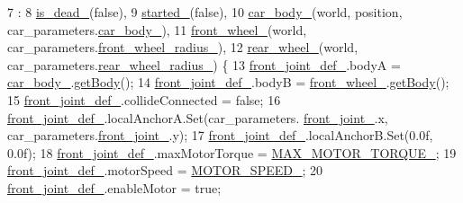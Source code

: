 \begin{DoxyCode}
7                                                                                     :
8                                                                 \hyperlink{classCar_a73e9873dd2c3c0ab7bbd6623ac9085a8}{is\_dead\_}(\textcolor{keyword}{false}),
9                                                                 \hyperlink{classCar_a348ee6b161f174a80ed4c38f9f84d789}{started\_}(\textcolor{keyword}{false}),
10                                                                 \hyperlink{classCar_a6a0d40752a134fb4f0693a28a4e64a0d}{car\_body\_}(world, position, 
      car\_parameters.\hyperlink{classCarParameters_a304345d7fd7771c87421e87785bce810}{car\_body\_}),
11                                                                 \hyperlink{classCar_a9c6abcefc82b364b09e67fad1b200beb}{front\_wheel\_}(world, 
      car\_parameters.\hyperlink{classCarParameters_ab66832af7618ebe04364630c92850096}{front\_wheel\_radius\_}),
12                                                                 \hyperlink{classCar_a2c29a444d66ee10134352516e42c3e0d}{rear\_wheel\_}(world, 
      car\_parameters.\hyperlink{classCarParameters_a6d3c3fc1c4eef292a7f536da2a089bbd}{rear\_wheel\_radius\_}) \{
13     \hyperlink{classCar_a4e2939a9c523e2e264ea2377a4829f7c}{front\_joint\_def\_}.bodyA = \hyperlink{classCar_a6a0d40752a134fb4f0693a28a4e64a0d}{car\_body\_}.\hyperlink{classCarBody_abf98252ba6d666ce771acfdf7c6d66cb}{getBody}();
14     \hyperlink{classCar_a4e2939a9c523e2e264ea2377a4829f7c}{front\_joint\_def\_}.bodyB = \hyperlink{classCar_a9c6abcefc82b364b09e67fad1b200beb}{front\_wheel\_}.\hyperlink{classWheel_af278d5423746dfc46834ec6b225d4e17}{getBody}();
15     \hyperlink{classCar_a4e2939a9c523e2e264ea2377a4829f7c}{front\_joint\_def\_}.collideConnected = \textcolor{keyword}{false};
16     \hyperlink{classCar_a4e2939a9c523e2e264ea2377a4829f7c}{front\_joint\_def\_}.localAnchorA.Set(car\_parameters.
      \hyperlink{classCarParameters_a471bcf264de846ca28e52bde8780f6a8}{front\_joint\_}.x, car\_parameters.\hyperlink{classCarParameters_a471bcf264de846ca28e52bde8780f6a8}{front\_joint\_}.y);
17     \hyperlink{classCar_a4e2939a9c523e2e264ea2377a4829f7c}{front\_joint\_def\_}.localAnchorB.Set(0.0f, 0.0f);
18     \hyperlink{classCar_a4e2939a9c523e2e264ea2377a4829f7c}{front\_joint\_def\_}.maxMotorTorque = \hyperlink{classCar_a70cd98e49fe96eec0bc4f0c414fd8e19}{MAX\_MOTOR\_TORQUE\_};
19     \hyperlink{classCar_a4e2939a9c523e2e264ea2377a4829f7c}{front\_joint\_def\_}.motorSpeed = \hyperlink{classCar_a371b4dcd77eb566677d633db4dd457ae}{MOTOR\_SPEED\_};
20     \hyperlink{classCar_a4e2939a9c523e2e264ea2377a4829f7c}{front\_joint\_def\_}.enableMotor = \textcolor{keyword}{true};

\end{DoxyCode}
